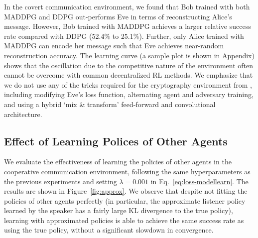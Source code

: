 \documentclass{article}
\begin{document}
In the covert communication environment, we found that Bob trained with both MADDPG and DDPG out-performs Eve in terms of reconstructing Alice's message. However, Bob trained with MADDPG achieves a larger relative success rate compared with DDPG (52.4\% to 25.1\%). Further, only Alice trained with MADDPG can encode her message such that Eve achieves near-random reconstruction accuracy. 
The learning curve (a sample plot is shown in Appendix) shows that the oscillation due to the competitive nature of the environment often cannot be overcome with common decentralized RL methods. We emphasize that we do not use any of the tricks required for the cryptography environment from \cite{abadi2016learning}, including modifying Eve's loss function, alternating agent and adversary training, and using a hybrid `mix \& transform' feed-forward and convolutional architecture.








\subsection{Effect of Learning Polices of Other Agents}

We evaluate the effectiveness of learning the policies of other agents in the cooperative communication environment, following the same hyperparameters as the previous experiments and setting $\lambda=0.001$ in Eq.~\ref{eq:loss-modellearn}. The results are shown in Figure~\ref{fig:approx}. 
We observe that despite not fitting the policies of other agents perfectly (in particular, the approximate listener policy learned by the speaker has a fairly large KL divergence to the true policy), learning with approximated policies is able to achieve the same success rate as using the true policy, without a significant slowdown in convergence.
\end{document}
